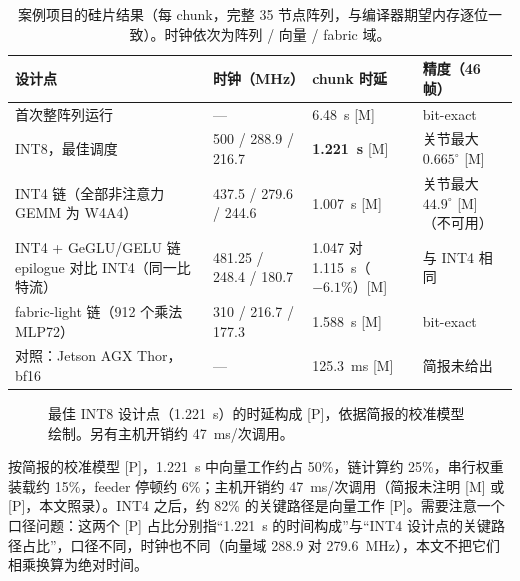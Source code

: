 \documentclass[a4paper,10.5pt]{ctexart}
\newcommand{\tM}{\textsf{[M]}}              %
\newcommand{\tP}{\textsf{[P]}}              %
\begin{document}
\begin{table}[t]
\centering
\caption{案例项目的硅片结果（每 chunk，完整 35 节点阵列，与编译器期望内存逐位一致）。时钟依次为阵列 / 向量 / fabric 域。}
\label{tab:results}
\small
\begin{tabularx}{\textwidth}{Y l l l}
\toprule
设计点 & 时钟（MHz） & chunk 时延 & 精度（46 帧） \\
\midrule
首次整阵列运行 & — & 6.48~s \tM & bit-exact \\
INT8，最佳调度 & 500 / 288.9 / 216.7 & \textbf{1.221~s} \tM & 关节最大 $0.665^\circ$ \tM \\
INT4 链（全部非注意力 GEMM 为 W4A4） & 437.5 / 279.6 / 244.6 & 1.007~s \tM & 关节最大 $44.9^\circ$ \tM（不可用） \\
INT4 + GeGLU/GELU 链 epilogue 对比 INT4（同一比特流） & 481.25 / 248.4 / 180.7 & 1.047 对 1.115~s（$-6.1\%$）\tM & 与 INT4 相同 \\
fabric-light 链（912 个乘法 MLP72） & 310 / 216.7 / 177.3 & 1.588~s \tM & bit-exact \\
\midrule
对照：Jetson AGX Thor，bf16 & — & 125.3~ms \tM & 简报未给出 \\
\bottomrule
\end{tabularx}
\end{table}

\begin{figure}[t]
\centering
{}
\caption{最佳 INT8 设计点（1.221~s）的时延构成 \tP，依据简报的校准模型绘制。另有主机开销约 47~ms/次调用。}
\label{fig:breakdown}
\end{figure}

按简报的校准模型 \tP，1.221~s 中向量工作约占 50\%，链计算约 25\%，串行权重装载约 15\%，feeder 停顿约 6\%；主机开销约 47~ms/次调用（简报未注明 \tM{} 或 \tP，本文照录）。INT4 之后，约 82\% 的关键路径是向量工作 \tP。需要注意一个口径问题：这两个 \tP{} 占比分别指“1.221~s 的时间构成”与“INT4 设计点的关键路径占比”，口径不同，时钟也不同（向量域 288.9 对 279.6~MHz），本文不把它们相乘换算为绝对时间。
\end{document}

